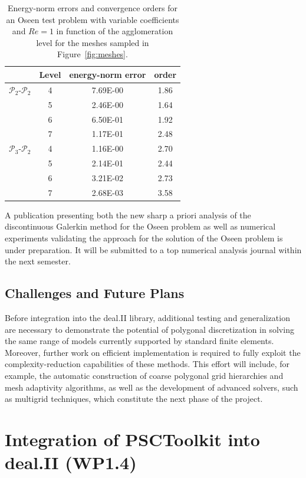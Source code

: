 \documentclass[a4paper,12pt]{article}
\begin{document}
\begin{table}[!ht]\centering
\caption{Energy-norm errors and convergence orders for an Oseen test problem with variable coefficients and $Re=1$ in function of the agglomeration level for the meshes sampled in Figure~\ref{fig:meshes}.}
\label{tb1}
{\small
\begin{tabular}[c]{cc|cc}\hline\hline%
&{Level}&energy-norm error&order\\ \hline
{$\mathcal{P}_2$-$\mathcal{P}_2$}
&4 &7.69E-00&1.86\\
&5 &2.46E-00&1.64\\
&6 &6.50E-01&1.92\\
&7 &1.17E-01&2.48\\
\hline
{$\mathcal{P}_3$-$\mathcal{P}_2$}
&4 &1.16E-00&2.70\\
&5 &2.14E-01&2.44\\
&6 &3.21E-02&2.73\\
&7 &2.68E-03&3.58\\
\hline\hline
\end{tabular}}
\label{tab:oseen}
\end{table}
A publication presenting both the new sharp a priori analysis of the discontinuous Galerkin method for the Oseen problem as well as numerical experiments validating the approach for the solution of the Oseen problem is under preparation. It will be submitted to a top numerical analysis journal within the next semester.


 \subsection{Challenges and Future Plans}

Before integration into the deal.II library, additional testing and generalization are necessary to demonstrate the potential of polygonal discretization in solving the same range of models currently supported by standard finite elements. Moreover, further work on efficient implementation is required to fully exploit the complexity-reduction capabilities of these methods. This effort will include, for example, the automatic construction of coarse polygonal grid hierarchies and mesh adaptivity algorithms, as well as the development of advanced solvers, such as multigrid techniques, which constitute the next phase of the project.


\section{Integration of PSCToolkit into deal.II (WP1.4)}
\end{document}
